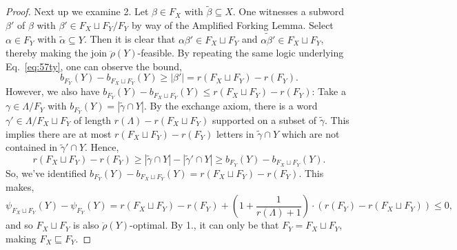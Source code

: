 \documentclass[11pt]{article}
\newcommand{\glang}{\Lambda}
\newcommand{\greedyrep}{\ddot{\rho}}
\begin{document}
\begin{proof}
    Next up we examine 2.
    Let $\beta \in F_X$ with $\widetilde{\beta}\subseteq X$.
    One witnesses a subword $\beta'$ of $\beta$ with $\beta'\in F_X\sqcup F_Y/F_Y$ by way of the Amplified Forking Lemma.
    Select $\alpha \in F_Y$ with $\widetilde{\alpha}\subseteq Y$.
    Then it is clear that $\alpha\beta'\in F_X\sqcup F_Y$ and $\widetilde{\alpha\beta'} \in F_X\sqcup F_Y$, thereby making the join $\greedyrep(Y)$-feasible.
    By repeating the same logic underlying Eq.~\ref{eq:57ty}, one can observe the bound,
    $$b_{F_Y}(Y) - b_{F_X\sqcup F_Y}(Y) \geq |\beta'| = r(F_X\sqcup F_Y) - r(F_Y).$$
    However, we also have $b_{F_Y}(Y) - b_{F_X\sqcup F_Y}(Y) \leq r(F_X\sqcup F_Y) - r(F_Y)$:
    Take a $\gamma \in \glang/F_Y$ with $b_{F_Y}(Y) = |\widetilde{\gamma}\cap Y|$.
    By the exchange axiom, there is a word $\gamma'\in \glang/F_X\sqcup F_Y$ of length $r(\glang) - r(F_X\sqcup F_Y)$ supported on a subset of $\widetilde{\gamma}$.
    This implies there are at most $r(F_X\sqcup F_Y) - r(F_Y)$ letters in $\widetilde{\gamma}\cap Y$ which are not contained in $\widetilde{\gamma}'\cap Y$.
    Hence,
    \[
        r(F_X\sqcup F_Y) - r(F_Y) \geq |\widetilde{\gamma}\cap Y| - |\widetilde{\gamma}'\cap Y| \geq b_{F_Y}(Y) - b_{F_X\sqcup F_Y}(Y).
    \]
    So, we've identified $b_{F_Y}(Y) - b_{F_X\sqcup F_Y}(Y) = r(F_X\sqcup F_Y) - r(F_Y)$.
    This makes,
    \[
        \psi_{F_X\sqcup F_Y}(Y) - \psi_{F_Y}(Y) = r(F_X\sqcup F_Y) - r(F_Y) + \left(1+\frac{1}{r(\glang) + 1}\right)\cdot\left(r(F_Y) - r(F_X\sqcup F_Y)\right) \leq 0,
    \]
    and so $F_X\sqcup F_Y$ is also $\greedyrep(Y)$-optimal.
    By 1., it can only be that $F_Y = F_X\sqcup F_Y$, making $F_X\sqsubseteq F_Y$.


\end{proof}
\end{document}
